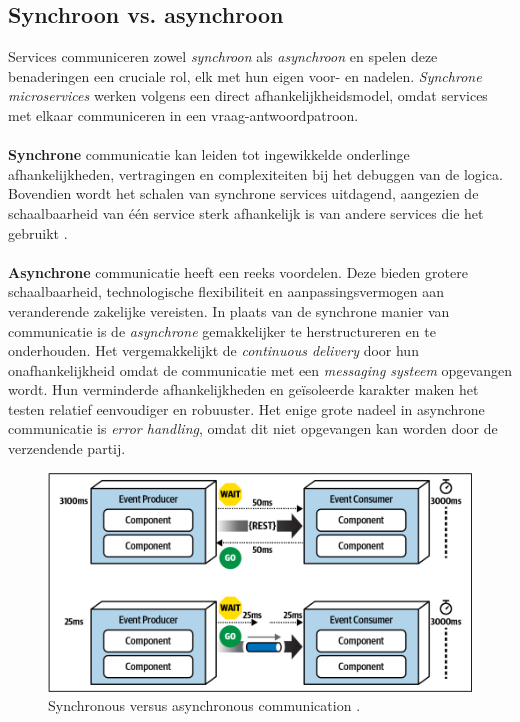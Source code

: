 \subsection{Synchroon vs. asynchroon}
Services communiceren zowel \emph{synchroon} als \emph{asynchroon} en spelen deze benaderingen een cruciale rol, 
elk met hun eigen voor- en nadelen. \emph{Synchrone microservices} werken volgens een direct 
afhankelijkheidsmodel, omdat services met elkaar communiceren in een vraag-antwoordpatroon. 
\\\\

\textbf{Synchrone} communicatie kan leiden tot ingewikkelde onderlinge afhankelijkheden, vertragingen en complexiteiten bij het debuggen 
van de logica. Bovendien wordt het schalen van synchrone services uitdagend, 
aangezien de schaalbaarheid van één service sterk afhankelijk is van andere services die het gebruikt \autocite{Bellemare2020}.  
\\\\

\textbf{Asynchrone} communicatie heeft een reeks voordelen. Deze bieden grotere schaalbaarheid, technologische 
flexibiliteit en aanpassingsvermogen aan veranderende zakelijke vereisten. 
In plaats van de synchrone manier van communicatie is de \emph{asynchrone} gemakkelijker te herstructureren en te onderhouden. 
Het vergemakkelijkt de \emph{continuous delivery} door hun onafhankelijkheid omdat de communicatie 
met een \emph{messaging systeem} opgevangen wordt. 
Hun verminderde afhankelijkheden en geïsoleerde karakter maken het testen relatief eenvoudiger en robuuster.
Het enige grote nadeel in asynchrone communicatie is \emph{error handling}, 
omdat dit niet opgevangen kan worden door de verzendende partij.
\newline

\begin{figure}[h!]
  \centering
  \includegraphics[width=.5\textwidth]{../voorstel/img/synchronous_vs_async_calls.png}
  \caption{\label{fig:sync-vs-async}Synchronous versus asynchronous communication \autocite[figure 14 -- 13]{MarkRichards2021}.}
\end{figure}


